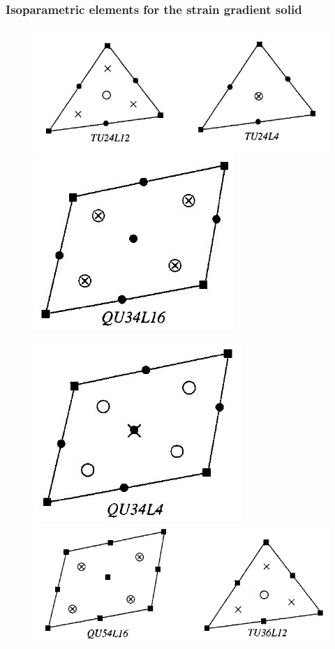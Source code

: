 \documentclass[12pt]{article}
\begin{document}
\subsubsection{ Isoparametric elements for the strain gradient solid}
\begin{figure}[H]
	\begin{center}
		\includegraphics[scale=0.6]{Shu_1_2.JPG}  \qquad
		\includegraphics[scale=0.6]{Shu_3.JPG}
	\end{center}  
\end{figure}
\begin{figure}[H]
	\begin{center}
		\includegraphics[scale=0.6]{Shu_4.JPG}  \qquad
		\includegraphics[scale=0.6]{Shu_5_6.JPG}
	\end{center}  
\end{figure}
\end{document}
